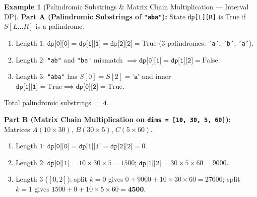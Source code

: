 \documentclass[11pt,a4paper]{article}
\theoremstyle{definition}
\newtheorem{example}{Example}[section]
\begin{document}
\begin{example}[Palindromic Substrings \& Matrix Chain Multiplication --- Interval DP]
\textbf{Part A (Palindromic Substrings of \texttt{"aba"}):} State \texttt{dp[L][R]} is True if $S[L \dots R]$ is a palindrome.
\begin{enumerate}
    \item Length $1$: $\texttt{dp[0][0]} = \texttt{dp[1][1]} = \texttt{dp[2][2]} = \text{True}$ ($3$ palindromes: \texttt{'a'}, \texttt{'b'}, \texttt{'a'}).
    \item Length $2$: \texttt{"ab"} and \texttt{"ba"} mismatch $\implies \texttt{dp[0][1]} = \texttt{dp[1][2]} = \text{False}$.
    \item Length $3$: \texttt{"aba"} has $S[0] = S[2] = \texttt{'a'}$ and inner $\texttt{dp[1][1]} = \text{True} \implies \texttt{dp[0][2]} = \text{True}$.
\end{enumerate}
Total palindromic substrings $= \mathbf{4}$.

\textbf{Part B (Matrix Chain Multiplication on \texttt{dims = [10, 30, 5, 60]}):} Matrices $A(10 \times 30)$, $B(30 \times 5)$, $C(5 \times 60)$.
\begin{enumerate}
    \item Length $1$: $\texttt{dp[0][0]} = \texttt{dp[1][1]} = \texttt{dp[2][2]} = 0$.
    \item Length $2$: $\texttt{dp[0][1]} = 10 \times 30 \times 5 = 1500$; $\texttt{dp[1][2]} = 30 \times 5 \times 60 = 9000$.
    \item Length $3$ ($[0, 2]$): split $k = 0$ gives $0 + 9000 + 10 \times 30 \times 60 = 27000$; split $k = 1$ gives $1500 + 0 + 10 \times 5 \times 60 = \mathbf{4500}$.
\end{enumerate}


\end{example}
\end{document}
